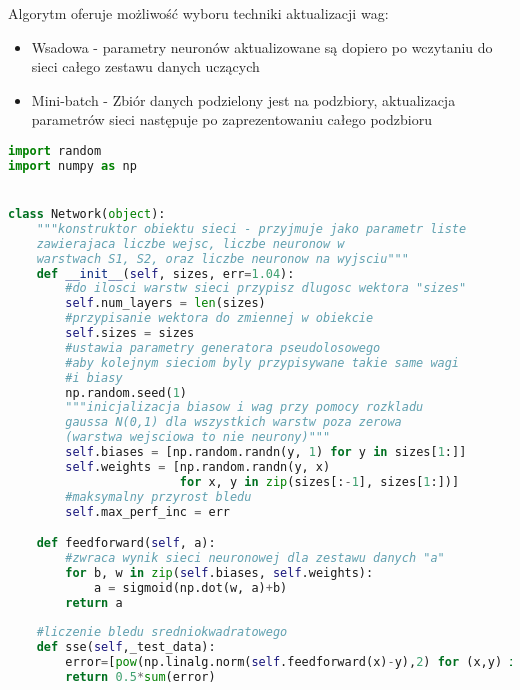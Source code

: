 \documentclass[12pt,twoside]{article}
\begin{document}
Algorytm oferuje możliwość wyboru techniki aktualizacji wag:
\begin{itemize}
\item Wsadowa -  parametry neuronów aktualizowane są dopiero po wczytaniu do sieci całego zestawu danych uczących
\item Mini-batch -  Zbiór danych podzielony jest na podzbiory, aktualizacja parametrów sieci następuje po zaprezentowaniu całego podzbioru

\end{itemize}

\begin{lstlisting}[language=Python,caption=Algorytm uczenia sieci,label={Kod2}]
import random
import numpy as np


class Network(object):
    """konstruktor obiektu sieci - przyjmuje jako parametr liste 
    zawierajaca liczbe wejsc, liczbe neuronow w 
    warstwach S1, S2, oraz liczbe neuronow na wyjsciu"""
    def __init__(self, sizes, err=1.04):
        #do ilosci warstw sieci przypisz dlugosc wektora "sizes"
        self.num_layers = len(sizes)
        #przypisanie wektora do zmiennej w obiekcie
        self.sizes = sizes
        #ustawia parametry generatora pseudolosowego
        #aby kolejnym sieciom byly przypisywane takie same wagi 
        #i biasy
        np.random.seed(1)
        """inicjalizacja biasow i wag przy pomocy rozkladu 
        gaussa N(0,1) dla wszystkich warstw poza zerowa 
        (warstwa wejsciowa to nie neurony)"""
        self.biases = [np.random.randn(y, 1) for y in sizes[1:]]
        self.weights = [np.random.randn(y, x)
                        for x, y in zip(sizes[:-1], sizes[1:])]
        #maksymalny przyrost bledu
        self.max_perf_inc = err

    def feedforward(self, a):
        #zwraca wynik sieci neuronowej dla zestawu danych "a"
        for b, w in zip(self.biases, self.weights):
            a = sigmoid(np.dot(w, a)+b)
        return a
    
    #liczenie bledu sredniokwadratowego
    def sse(self,_test_data):
        error=[pow(np.linalg.norm(self.feedforward(x)-y),2) for (x,y) in _test_data]
        return 0.5*sum(error)    


\end{lstlisting}
\end{document}
